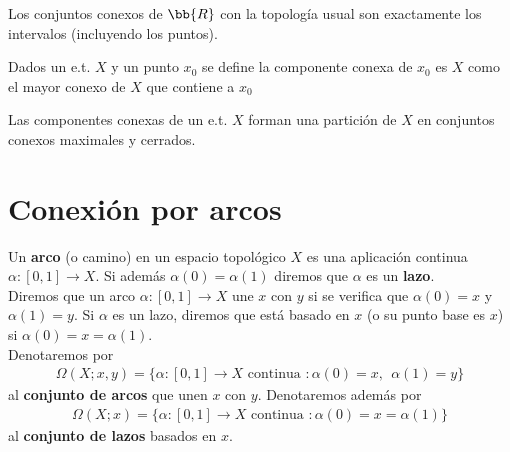 \begin{teo}
    Los conjuntos conexos de $\bb{R}$ con la topología usual son exactamente los intervalos (incluyendo los puntos).
\end{teo}

\begin{definicion}
    Dados un e.t. $X$ y un punto $x_0$ se define la componente conexa de $x_0$ es $X$ como el mayor conexo de $X$ que contiene a $x_0$
\end{definicion}

\begin{teo}
    Las componentes conexas de un e.t. $X$ forman una partición de $X$ en conjuntos conexos maximales y cerrados.
\end{teo}

\section{Conexión por arcos}

\begin{definicion}
    Un \textbf{arco} (o camino) en un espacio topológico $X$ es una aplicación continua $\alpha:[0,1]\to X$. Si además $\alpha(0) = \alpha(1)$ diremos que $\alpha$ es un \textbf{lazo}.\\

    Diremos que un arco $\alpha:[0,1]\to X$ une $x$ con $y$ si se verifica que $\alpha(0)=x$ y $\alpha(1) = y$. Si $\alpha$ es un lazo, diremos que está basado en $x$ (o su punto base es $x$) si $\alpha(0)=x=\alpha(1)$.\\

    Denotaremos por 
    \begin{gather*}
        \Omega(X;x,y) = \{\alpha:[0,1]\to X \text{ continua } : \alpha(0)=x, \ \ \alpha(1)=y\}
    \end{gather*}
    al \textbf{conjunto de arcos} que unen $x$ con $y$. Denotaremos además por  
    \begin{gather*}
        \Omega(X;x) = \{\alpha:[0,1]\to X \text{ continua } : \alpha(0)=x=\alpha(1)\}
    \end{gather*}
    al \textbf{conjunto de lazos} basados en $x$.
\end{definicion}

